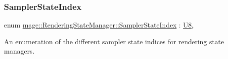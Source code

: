 \hypertarget{classmage_1_1_rendering_state_manager_ad756bcfaf65de7ce2a7ac46e0ba97557}{}\label{classmage_1_1_rendering_state_manager_ad756bcfaf65de7ce2a7ac46e0ba97557} 
\subsubsection{\texorpdfstring{Sampler\+State\+Index}{SamplerStateIndex}}
{\footnotesize\ttfamily enum \hyperlink{classmage_1_1_rendering_state_manager_ad756bcfaf65de7ce2a7ac46e0ba97557}{mage\+::\+Rendering\+State\+Manager\+::\+Sampler\+State\+Index} \+: \hyperlink{namespacemage_afc638980bc6154f15af5e2d93a0e0ea9}{U8}\hspace{0.3cm}{\ttfamily [strong]}, {\ttfamily [private]}}

An enumeration of the different sampler state indices for rendering state managers.

